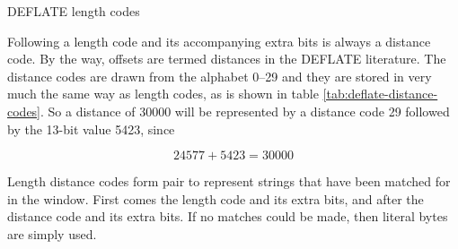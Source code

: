 \begin{table}
  \caption{DEFLATE length codes}
  \label{tab:deflate-length-codes}
\end{table}

Following a length code and its accompanying extra bits is always a
distance code. By the way, offsets are termed distances in the DEFLATE
literature. The distance codes are drawn from the alphabet 0--29 and
they are stored in very much the same way as length codes, as is shown
in table \ref{tab:deflate-distance-codes}. So a distance of $30000$
will be represented by a distance code 29 followed by the 13-bit value
5423, since

\begin{equation*}
  24577 + 5423 = 30000
\end{equation*}

Length distance codes form pair to represent strings that have been
matched for in the window. First comes the length code and its extra
bits, and after the distance code and its extra bits. If no matches
could be made, then literal bytes are simply used.

